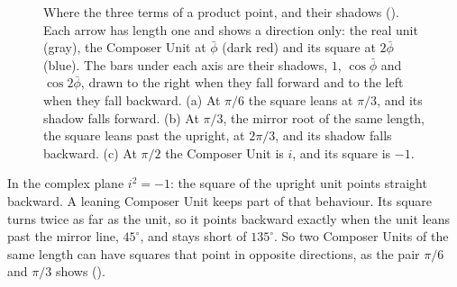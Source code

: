 \begin{figure}[tb]
\caption[Where the square points]{Where the three terms of a product point, and their shadows (). Each arrow has length one and shows a direction only: the real unit (gray), the Composer Unit at $\bar{\phi}$ (dark red) and its square at $2\bar{\phi}$ (blue). The bars under each axis are their shadows, $1$, $\cos\bar{\phi}$ and $\cos 2\bar{\phi}$, drawn to the right when they fall forward and to the left when they fall backward. (a) At $\pi/6$ the square leans at $\pi/3$, and its shadow falls forward. (b) At $\pi/3$, the mirror root of the same length, the square leans past the upright, at $2\pi/3$, and its shadow falls backward. (c) At $\pi/2$ the Composer Unit is $i$, and its square is $-1$.}
\label{fig:square-shadows}
\end{figure}

\begin{plainwords}
In the complex plane $i^2 = -1$: the square of the upright unit points straight backward. A leaning Composer Unit keeps part of that behaviour. Its square turns twice as far as the unit, so it points backward exactly when the unit leans past the mirror line, $45^\circ$, and stays short of $135^\circ$. So two Composer Units of the same length can have squares that point in opposite directions, as the pair $\pi/6$ and $\pi/3$ shows ().
\end{plainwords}

